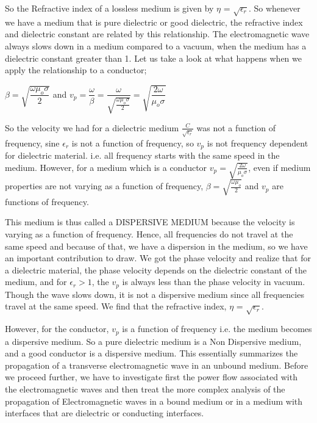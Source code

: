 So the Refractive index of a lossless medium is given by  $\eta$ = $\sqrt{\epsilon_{r}}$. So whenever we have a medium that is pure dielectric or good dielectric, the refractive index and dielectric constant are related by this relationship. The electromagnetic wave always slows down in a medium compared to a vacuum, when the medium has a dielectric constant greater than 1.
Let us take a look at what happens when we apply the relationship to a conductor;

$\beta=\sqrt{\dfrac{\omega\mu_{o}\sigma}{2}}$  and   $v_p=\dfrac{\omega}{\beta}=\dfrac{\omega}{\sqrt{\frac{\omega\mu_{o}\sigma}{2}}}=\sqrt{\dfrac{2\omega}{\mu_{o}\sigma}}$

So the velocity we had for a dielectric medium $\frac{C}{\sqrt{\epsilon_{r}}}$ was not a function of frequency, sine $\epsilon_{r}$ is not a function of frequency, so $v_p$ is not frequency dependent for dielectric material. i.e. all frequency starts with the same speed in the medium.
However, for a medium which is a conductor $v_p=\sqrt{\frac{2\omega}{\mu_{o}\sigma}}$, even if medium properties are not varying as a function of frequency, $\beta=\sqrt{\frac{\omega\mu_{o}}{2}}$ and $v_p$ are functions of frequency.

This medium is thus called a DISPERSIVE MEDIUM because the velocity is varying as a function of frequency. Hence, all frequencies do not travel at the same speed and because of that, we have a dispersion in the medium, so we have an important contribution to draw.
We got the phase velocity and realize that for a dielectric material, the phase velocity depends on the dielectric constant of the medium, and for $\epsilon_{r} > 1$, the $v_p$ is always less than the phase velocity in vacuum. Though the wave slows down, it is not a dispersive medium since all frequencies travel at the same speed. We find that the refractive index, $\eta$ = $\sqrt{\epsilon_{r}}$.

However, for the conductor, $v_p$ is a function of frequency i.e. the medium becomes a dispersive medium. So a pure dielectric medium is a Non Dispersive medium, and a good conductor is a dispersive medium. This essentially summarizes the propagation of a transverse electromagnetic wave in an unbound medium. Before we proceed further, we have to investigate first the power flow associated with the electromagnetic waves and then treat the more complex analysis of the propagation of Electromagnetic waves in a bound medium or in a medium with interfaces that are dielectric or conducting interfaces.
